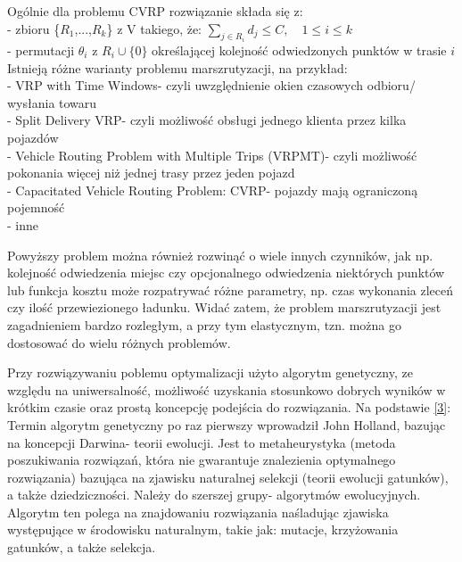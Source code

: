 \documentclass[a4paper, twoside, 12pt, justified]{article}
\begin{document}
	Ogólnie dla problemu CVRP rozwiązanie składa się z:\\
	- zbioru \{$R_{1}$,...,$R_{k}$\} z V takiego, że:  $\sum_{j \in R_i} d_j \leq C, \quad 1 \leq i \leq k$ \\
	- permutacji $\theta_i$ z $R_i \cup \{0\}$ określającej kolejność odwiedzonych punktów w trasie $i$\\
	
	Istnieją różne warianty problemu marszrutyzacji, na przykład:\\ 
	- VRP with Time Windows- czyli uwzględnienie okien czasowych odbioru/ wysłania towaru\\
	- Split Delivery VRP- czyli możliwość obsługi jednego klienta przez kilka pojazdów\\
	- Vehicle Routing Problem with Multiple Trips (VRPMT)- czyli możliwość pokonania więcej niż jednej trasy przez jeden pojazd\\
	- Capacitated Vehicle Routing Problem: CVRP- pojazdy mają ograniczoną pojemność\\ 
	- inne

	\vspace{5mm} %

	Powyższy problem można również rozwinąć o wiele innych czynników, jak np. kolejność odwiedzenia miejsc czy opcjonalnego odwiedzenia niektórych punktów lub funkcja kosztu może rozpatrywać różne parametry, np. czas wykonania zleceń czy ilość przewiezionego ładunku. Widać zatem, że problem marszrutyzacji jest zagadnieniem bardzo rozległym, a przy tym elastycznym, tzn. można go dostosować do wielu różnych problemów.
	
	\vspace{5mm}
	
	Przy rozwiązywaniu poblemu optymalizacji użyto algorytm genetyczny, ze względu na uniwersalność, możliwość uzyskania stosunkowo dobrych wyników w krótkim czasie oraz prostą koncepcję podejścia do rozwiązania. Na podstawie \hyperlink{ag}{[3]}:\\
	Termin algorytm genetyczny po raz pierwszy wprowadził John Holland, bazując na koncepcji Darwina- teorii ewolucji. Jest to metaheurystyka (metoda poszukiwania rozwiązań, która nie gwarantuje znalezienia optymalnego rozwiązania) bazująca na zjawisku naturalnej selekcji (teorii ewolucji gatunków), a także dziedziczności. Należy do szerszej grupy- algorytmów ewolucyjnych. Algorytm ten polega na znajdowaniu rozwiązania naśladując zjawiska występujące w środowisku naturalnym, takie jak: mutacje, krzyżowania gatunków, a także selekcja. \newpage
	
\end{document}
